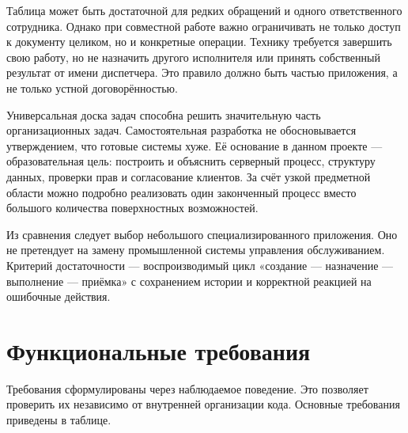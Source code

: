 \documentclass{timcw}
\begin{document}
Таблица может быть достаточной для редких обращений и одного ответственного сотрудника. Однако при совместной работе важно ограничивать не только доступ к документу целиком, но и конкретные операции. Технику требуется завершить свою работу, но не назначить другого исполнителя или принять собственный результат от имени диспетчера. Это правило должно быть частью приложения, а не только устной договорённостью.

Универсальная доска задач способна решить значительную часть организационных задач. Самостоятельная разработка не обосновывается утверждением, что готовые системы хуже. Её основание в данном проекте — образовательная цель: построить и объяснить серверный процесс, структуру данных, проверки прав и согласование клиентов. За счёт узкой предметной области можно подробно реализовать один законченный процесс вместо большого количества поверхностных возможностей.

Из сравнения следует выбор небольшого специализированного приложения. Оно не претендует на замену промышленной системы управления обслуживанием. Критерий достаточности — воспроизводимый цикл «создание — назначение — выполнение — приёмка» с сохранением истории и корректной реакцией на ошибочные действия.

\section{Функциональные требования}

Требования сформулированы через наблюдаемое поведение. Это позволяет проверить их независимо от внутренней организации кода. Основные требования приведены в таблице.
\end{document}
